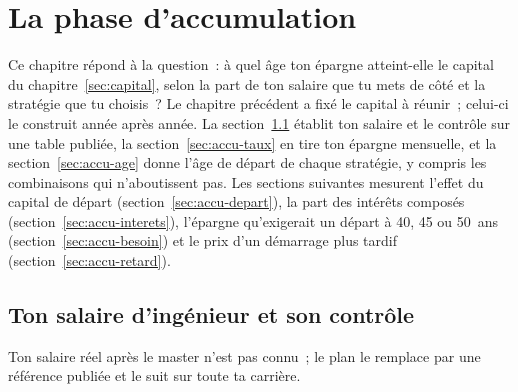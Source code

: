 \section{La phase d'accumulation}\label{sec:accumulation}

Ce chapitre r\'epond \`a la question~: \`a quel \^age ton \'epargne atteint-elle le capital du
chapitre~\ref{sec:capital}, selon la part de ton salaire que tu mets de c\^ot\'e et la strat\'egie que
tu choisis~? Le chapitre pr\'ec\'edent a fix\'e le capital \`a r\'eunir~; celui-ci le construit ann\'ee
apr\`es ann\'ee. La section~\ref{sec:accu-salaire} \'etablit ton salaire et le contr\^ole sur une table
publi\'ee, la section~\ref{sec:accu-taux} en tire ton \'epargne mensuelle, et la
section~\ref{sec:accu-age} donne l'\^age de d\'epart de chaque strat\'egie, y compris les combinaisons
qui n'aboutissent pas. Les sections suivantes mesurent l'effet du capital de d\'epart
(section~\ref{sec:accu-depart}), la part des int\'er\^ets compos\'es (section~\ref{sec:accu-interets}),
l'\'epargne qu'exigerait un d\'epart \`a 40, 45 ou 50~ans (section~\ref{sec:accu-besoin}) et le prix
d'un d\'emarrage plus tardif (section~\ref{sec:accu-retard}).

\subsection{Ton salaire d'ing\'enieur et son contr\^ole}\label{sec:accu-salaire}

Ton salaire r\'eel apr\`es le master n'est pas connu~; le plan le remplace par une r\'ef\'erence
publi\'ee et le suit sur toute ta carri\`ere.


